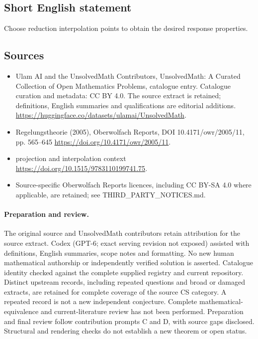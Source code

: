 \documentclass[11pt]{article}
\begin{document}
\subsection{Short English statement}
Choose reduction interpolation points to obtain the desired response properties.
\subsection{Sources}
\begin{itemize}
\item[\hypertarget{source:statement:1}{S1}] Ulam AI and the UnsolvedMath Contributors, UnsolvedMath: A Curated Collection of Open Mathematics Problems, catalogue entry. Catalogue curation and metadata: CC BY 4.0. The source extract is retained; definitions, English summaries and qualifications are editorial additions.
\url{https://huggingface.co/datasets/ulamai/UnsolvedMath}.
\item[\hypertarget{source:statement:2}{S2}] Regelungstheorie (2005), Oberwolfach Reports, DOI 10.4171/owr/2005/11, pp. 565--645
\url{https://doi.org/10.4171/owr/2005/11}.
\item[\hypertarget{source:statement:3}{S3}] projection and interpolation context
\url{https://doi.org/10.1515/9783110199741.75}.
\item Source-specific Oberwolfach Reports licences, including CC BY-SA 4.0 where applicable, are retained; see THIRD\_PARTY\_NOTICES.md.
\end{itemize}
\paragraph{Preparation and review.}
The original source and UnsolvedMath contributors retain attribution for the source extract. Codex (GPT-6; exact serving revision not exposed) assisted with definitions, English summaries, scope notes and formatting. No new human mathematical authorship or independently verified solution is asserted. Catalogue identity checked against the complete supplied registry and current repository. Distinct upstream records, including repeated questions and broad or damaged extracts, are retained for complete coverage of the source CS category. A repeated record is not a new independent conjecture. Complete mathematical-equivalence and current-literature review has not been performed. Preparation and final review follow contribution prompts C and D, with source gaps disclosed. Structural and rendering checks do not establish a new theorem or open status.
\label{end:statement}
\end{document}

